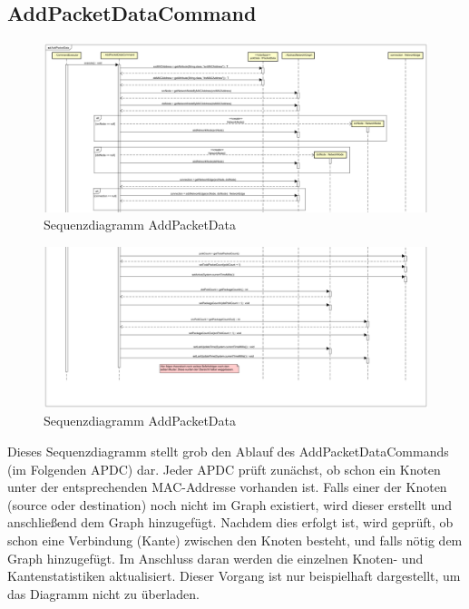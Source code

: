 \subsection{AddPacketDataCommand}
\begin{figure}
  \centering
  \includegraphics[width=\paperwidth]{../diagramimages/sd_AddPacketData1.png}
  \caption[Sequenzdiagramm AddPacketData]{Sequenzdiagramm AddPacketData}
\end{figure}
\FloatBarrier

\begin{figure}
  \centering
  \includegraphics[width=\paperwidth]{../diagramimages/sd_AddPacketData2.png}
  \caption[Sequenzdiagramm AddPacketData]{Sequenzdiagramm AddPacketData}
\end{figure}
\FloatBarrier

Dieses Sequenzdiagramm stellt grob den Ablauf des AddPacketDataCommands (im Folgenden APDC) dar. Jeder APDC prüft zunächst,
ob schon ein Knoten unter der entsprechenden MAC-Addresse vorhanden ist. Falls einer der Knoten (source oder destination)
noch nicht im Graph existiert, wird dieser erstellt und anschließend dem Graph hinzugefügt. Nachdem dies erfolgt ist, wird
geprüft, ob schon eine Verbindung (Kante) zwischen den Knoten besteht, und falls nötig dem Graph hinzugefügt.
Im Anschluss daran werden die einzelnen Knoten- und Kantenstatistiken aktualisiert. Dieser Vorgang ist nur beispielhaft
dargestellt, um das Diagramm nicht zu überladen.
